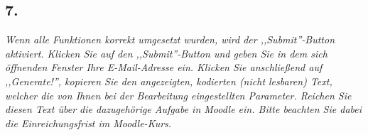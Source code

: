 \documentclass[a4paper,10pt,titlepage]{scrartcl}
\begin{document}
\subsection*{7.}
\textit{Wenn alle Funktionen korrekt umgesetzt wurden, wird der ,,Submit''-Button aktiviert. Klicken Sie auf den ,,Submit''-Button und geben Sie in dem sich öffnenden Fenster Ihre E-Mail-Adresse ein. Klicken Sie anschließend auf ,,Generate!'', kopieren Sie den angezeigten, kodierten (nicht lesbaren) Text, welcher die von Ihnen bei der Bearbeitung eingestellten Parameter. Reichen Sie diesen Text über die dazugehörige Aufgabe in Moodle ein. Bitte beachten Sie dabei die Einreichungsfrist im Moodle-Kurs.}
\end{document}
